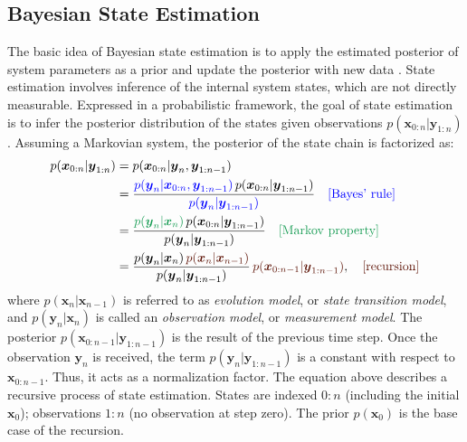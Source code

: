 \subsection{Bayesian State Estimation}
The basic idea of Bayesian state estimation is to apply the estimated posterior of system parameters as a prior and update the posterior with new data \citep{bayesestimation}. State estimation involves inference of the internal system states, which are not directly measurable. Expressed in a probabilistic framework, the goal of state estimation is to infer the posterior distribution of the states given observations $p(\boldsymbol{x}_{0:n}|\boldsymbol{y}_{1:n})$. Assuming a Markovian system, the posterior of the state chain is factorized as:
\begin{equation}
    \begin{split}
        p(\boldsymbol{x}_{0:n}|\boldsymbol{y}_{1:n})&=p(\boldsymbol{x}_{0:n}|\boldsymbol{y}_{n}, \boldsymbol{y}_{1:n-1})\\
        &=\frac{\textcolor{blue}{p(\boldsymbol{y}_n|\boldsymbol{x}_{0:n}, \boldsymbol{y}_{1:n-1})}\,p(\boldsymbol{x}_{0:n}|\boldsymbol{y}_{1:n-1})}{\textcolor{blue}{p(\boldsymbol{y}_n|\boldsymbol{y}_{1:n-1})}} \quad\text{\textcolor{blue}{[Bayes' rule]}} \\
        &=\frac{\textcolor{ForestGreen}{p(\boldsymbol{y}_n|\boldsymbol{x}_n)}\,p(\boldsymbol{x}_{0:n}|\boldsymbol{y}_{1:n-1})}{p(\boldsymbol{y}_n|\boldsymbol{y}_{1:n-1})} \quad\text{\textcolor{ForestGreen}{[Markov property]}} \\
        &=\frac{p(\boldsymbol{y}_n|\boldsymbol{x}_n)\,\textcolor{Sepia}{p(\boldsymbol{x}_{n}|\boldsymbol{x}_{n-1})}}{p(\boldsymbol{y}_n|\boldsymbol{y}_{1:n-1})}\,\textcolor{Sepia}{p(\boldsymbol{x}_{0:n-1}|\boldsymbol{y}_{1:n-1})}, \quad\text{\textcolor{Sepia}{[recursion]}}
    \end{split}
\end{equation}
where $p(\boldsymbol{x}_{n}|\boldsymbol{x}_{n-1})$ is referred to as \textit{evolution model}, or \textit{state transition model}, and $p(\boldsymbol{y}_n|\boldsymbol{x}_n)$ is called an \textit{observation model}, or \textit{measurement model}. The posterior $p(\boldsymbol{x}_{0:n-1}|\boldsymbol{y}_{1:n-1})$ is the result of the previous time step. Once the observation $\boldsymbol{y}_n$ is received, the term $p(\boldsymbol{y}_n|\boldsymbol{y}_{1:n-1})$ is a constant with respect to $\boldsymbol{x}_{0:n-1}$. Thus, it acts as a normalization factor. The equation above describes a recursive process of state estimation. States are indexed $0:n$ (including the initial $\boldsymbol{x}_0$); observations $1:n$ (no observation at step zero). The prior $p(\boldsymbol{x}_0)$ is the base case of the recursion.
